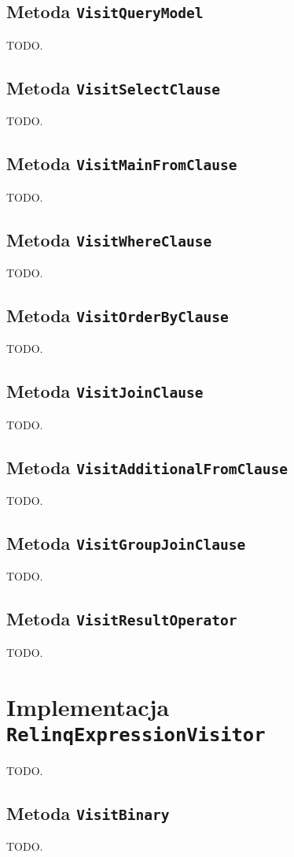 \subsection{Metoda \texttt{VisitQueryModel}}
TODO.

\subsection{Metoda \texttt{VisitSelectClause}}
TODO.

\subsection{Metoda \texttt{VisitMainFromClause}}
TODO.

\subsection{Metoda \texttt{VisitWhereClause}}
TODO.

\subsection{Metoda \texttt{VisitOrderByClause}}
TODO.

\subsection{Metoda \texttt{VisitJoinClause}}
TODO.

\subsection{Metoda \texttt{VisitAdditionalFromClause}}
TODO.

\subsection{Metoda \texttt{VisitGroupJoinClause}}
TODO.

\subsection{Metoda \texttt{VisitResultOperator}}
TODO.

\section{Implementacja \texttt{RelinqExpressionVisitor}}
TODO.

\subsection{Metoda \texttt{VisitBinary}}
TODO.


